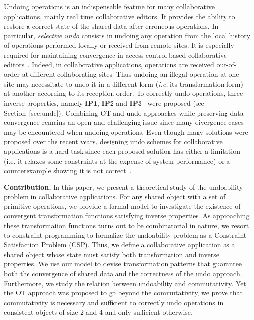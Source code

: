 \documentclass[submission,copyright,creativecommons]{eptcs}
\begin{document}
Undoing operations is an  indispensable feature for many collaborative applications, mainly real
time collaborative editors. It provides the ability to restore a correct state of the shared data after erroneous operations. In particular, \emph{selective undo} consists in undoing any operation from the local history of operations performed locally or received from  remote sites. It is especially required for  maintaining convergence in access control-based collaborative editors~\cite{CherifIR11,CherifIR14}. Indeed, in collaborative applications, operations are received out-of-order at different collaborating sites. Thus undoing an illegal operation at one site may necessitate to undo it in a different form (\textit{i.e.} its transformation form) at another according to its reception order. To correctly undo operations, three inverse properties,  namely $\mathbf{IP1}$, $\mathbf{IP2}$ and $\mathbf{IP3}$~\cite{Atul94,Sun02,SunS09,Ferrie04}  were proposed (see Section~\ref{sec:undo}). Combining OT and undo approaches while preserving data convergence
remains an open and challenging issue since many divergence cases may be encountered when undoing operations.
Even though many solutions were proposed over the recent years, designing undo schemes for collaborative applications is a hard task
since each proposed solution has either a limitation (i.e. it relaxes some constraints at the expense of system performance) or a counterexample showing it is not correct~\cite{SunS09, BinShao10}.

\medskip
\noindent\textbf{Contribution.}
In this paper, we present a theoretical study of the undoability problem in collaborative applications. For any shared object with a set of primitive operations, 
we provide a formal model to investigate the existence  of convergent transformation functions satisfying inverse properties. As approaching these transformation functions turns out to be combinatorial in nature, we resort to constraint programming  to formalize the  undoability problem as a Constraint Satisfaction Problem (CSP).
Thus, we define a collaborative application as a shared object whose state must satisfy both transformation and inverse properties. We use our model to devise transformation patterns that guarantee both the  convergence of shared data and the correctness of the undo approach. Furthermore, we study the relation between undoability and commutativity. Yet the OT approach was proposed to go beyond the commutativity, we prove that commutativity is necessary and sufficient to correctly undo operations in  consistent objects of size $2$ and $4$ and only sufficient otherwise.
\end{document}

